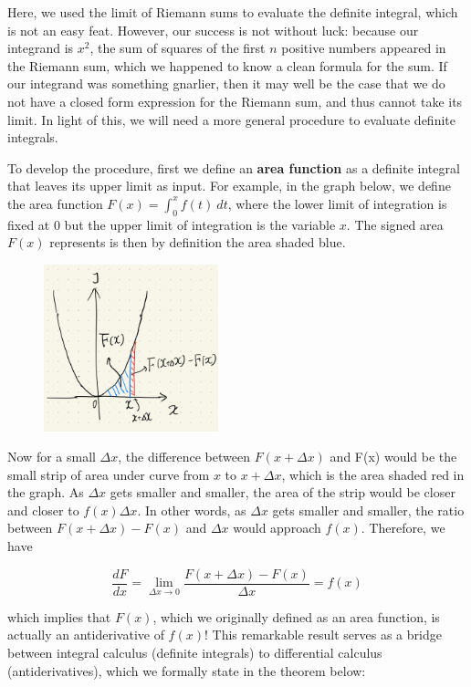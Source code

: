 Here, we used the limit of Riemann sums to evaluate the definite integral, which is not an easy feat.  However, our success is not without luck: because our integrand is $x^2$, the sum of squares of the first $n$ positive numbers appeared in the Riemann sum, which we happened to know a clean formula for the sum.  If our integrand was something gnarlier, then it may well be the case that we do not have a closed form expression for the Riemann sum, and thus cannot take its limit.  In light of this, we will need a more general procedure to evaluate definite integrals. 

To develop the procedure, first we define an \textbf{area function} as a definite integral that leaves its upper limit as input.  For example, in the graph below, we define the area function $F(x) = \int_0^x f(t)~dt$, where the lower limit of integration is fixed at $0$ but the upper limit of integration is the variable $x$.  The signed area $F(x)$ represents is then by definition the area shaded blue.  

\begin{figure}[ht]
    \centering
    \includegraphics[width = 0.45\textwidth]{figures/chap 07/FTC.png}
\end{figure}

Now for a small $\Delta x$, the difference between $F(x+\Delta x)$ and F(x) would be the small strip of area under curve from $x$ to $x + \Delta x$, which is the area shaded red in the graph.  As $\Delta x$ gets smaller and smaller, the area of the strip would be closer and closer to $f(x) \Delta x$.  In other words, as $\Delta x$ gets smaller and smaller, the ratio between $F(x + \Delta x) - F(x)$ and $\Delta x$ would approach $f(x)$.  Therefore, we have

\[\frac{dF}{dx} = \lim_{\Delta x \rightarrow 0} \frac{F(x + \Delta x) - F(x)}{\Delta x} = f(x)\]

which implies that $F(x)$, which we originally defined as an area function, is actually an antiderivative of $f(x)$!  This remarkable result serves as a bridge between integral calculus (definite integrals) to differential calculus (antiderivatives), which we formally state in the theorem below:

